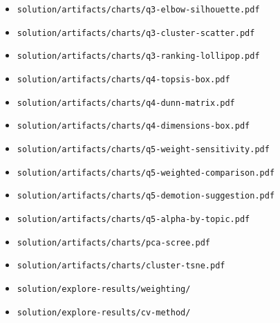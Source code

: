 \documentclass[UTF8,12pt]{ctexart}
\begin{document}
\begin{itemize}[leftmargin=*,itemsep=0pt]
    \item \texttt{solution/artifacts/charts/q3-elbow-silhouette.pdf}
    \item \texttt{solution/artifacts/charts/q3-cluster-scatter.pdf}
    \item \texttt{solution/artifacts/charts/q3-ranking-lollipop.pdf}
    \item \texttt{solution/artifacts/charts/q4-topsis-box.pdf}
    \item \texttt{solution/artifacts/charts/q4-dunn-matrix.pdf}
    \item \texttt{solution/artifacts/charts/q4-dimensions-box.pdf}
    \item \texttt{solution/artifacts/charts/q5-weight-sensitivity.pdf}
    \item \texttt{solution/artifacts/charts/q5-weighted-comparison.pdf}
    \item \texttt{solution/artifacts/charts/q5-demotion-suggestion.pdf}
    \item \texttt{solution/artifacts/charts/q5-alpha-by-topic.pdf}
    \item \texttt{solution/artifacts/charts/pca-scree.pdf}
    \item \texttt{solution/artifacts/charts/cluster-tsne.pdf}
    \item \texttt{solution/explore-results/weighting/}
    \item \texttt{solution/explore-results/cv-method/}
\end{itemize}
\end{document}
